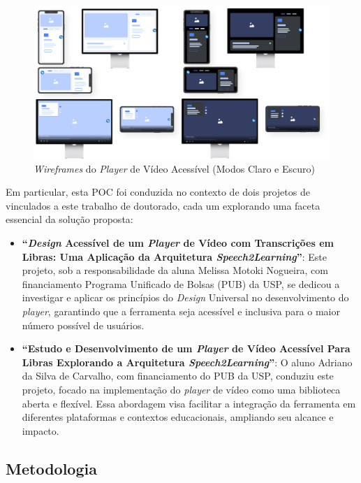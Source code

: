 \begin{figure}[htbp]
\centering
\caption{\textit{Wireframes} do \textit{Player} de Vídeo Acessível (Modos Claro e Escuro)}
\label{fig:chapter4-cs2-poc-wireframes}
\includegraphics[width=1\textwidth]{images/chapter4-cs2-poc-wireframes.png}
\fautor
\end{figure}

Em particular, esta POC foi conduzida no contexto de dois projetos de  vinculados a este trabalho de doutorado, cada um explorando uma faceta essencial da solução proposta:

\begin{itemize}
\item \textbf{``\textit{Design} Acessível de um \textit{Player} de Vídeo com Transcrições em Libras: Uma Aplicação da Arquitetura \textit{Speech2Learning}''}: Este projeto, sob a responsabilidade da aluna Melissa Motoki Nogueira, com financiamento Programa Unificado de Bolsas (PUB) da USP, se dedicou a investigar e aplicar os princípios do \textit{Design} Universal no desenvolvimento do \textit{player}, garantindo que a ferramenta seja acessível e inclusiva para o maior número possível de usuários.
\item \textbf{``Estudo e Desenvolvimento de um \textit{Player} de Vídeo Acessível Para Libras Explorando a Arquitetura \textit{Speech2Learning}''}: O aluno Adriano da Silva de Carvalho, com financiamento do PUB da USP, conduziu este projeto, focado na implementação do \textit{player} de vídeo como uma biblioteca aberta e flexível. Essa abordagem visa facilitar a integração da ferramenta em diferentes plataformas e contextos educacionais, ampliando seu alcance e impacto.
\end{itemize}

\subsection{Metodologia}

